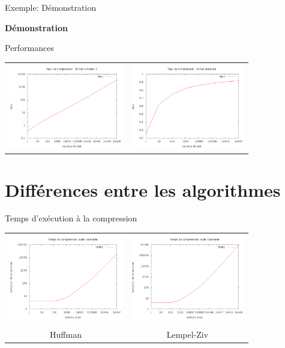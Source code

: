 \documentclass[french]{beamer}
\begin{document}
\begin{frame}{Exemple: Démonstration}
	\begin{center}
	\textbf{Démonstration}
	\end{center}
\end{frame}

\begin{frame}{Performances}
	\begin{center}
	\begin{tabular}{l | l}
	\includegraphics[width=5cm]{LZConstant.png} & 
	\includegraphics[width=5cm]{LZAleatoire.png}
	\end{tabular}
	\end{center}
\end{frame}



\section{Différences entre les algorithmes}
\begin{frame}{Temps d'exécution à la compression} 
	\begin{center}
	\begin{tabular}{c | c}
	\includegraphics[width=5cm]{tempsChC.png} & 
	\includegraphics[width=5cm]{tempsClzC.png} \\  &  \\ 
	Huffman & Lempel-Ziv
	\end{tabular}
		\end{center}
\end{frame}
	
\end{document}
